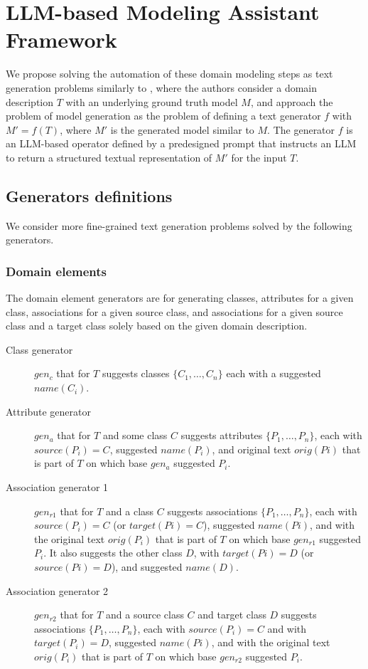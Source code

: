 \chapter{LLM-based Modeling Assistant Framework}

We propose solving the automation of these domain modeling steps as text generation problems similarly to \citet{Chen2023}, where the authors consider a domain description $T$ with an underlying ground truth model $M$, and approach the problem of model generation as the problem of defining a text generator $f$ with $M' = f(T)$, where $M'$ is the generated model similar to $M$. The generator $f$ is an LLM-based operator defined by a predesigned prompt that instructs an LLM to return a structured textual representation of $M'$ for the input $T$.


\section{Generators definitions}

We consider more fine-grained text generation problems solved by the following generators.


\subsection{Domain elements}

The domain element generators are for generating classes, attributes for a given class, associations for a given source class, and associations for a given source class and a target class solely based on the given domain description.

\begin{description}
\item [Class generator] $gen_c$ that for $T$ suggests classes $\{C_1, \ldots, C_n\}$ each with a suggested $name(C_i)$.

\item [Attribute generator] $gen_a$ that for $T$ and some class $C$ suggests attributes $\{P_1, \ldots, P_n\}$, each with $source(P_i) = C$, suggested $name(P_i)$, and original text $orig(Pi)$ that is part of $T$ on which base $gen_a$ suggested $P_i$.

\item [Association generator 1] $gen_{r1}$ that for $T$ and a class $C$ suggests associations $\{P_1, \ldots, P_n\}$, each with $source(P_i) = C$ (or $target(Pi) = C$), suggested $name(Pi)$, and with the original text $orig(P_i)$ that is part of $T$ on which base $gen_{r1}$ suggested $P_i$. It also suggests the other class $D$, with $target(Pi)= D$ (or $source(Pi) = D$), and suggested $name(D)$.

\item [Association generator 2] $gen_{r2}$ that for $T$ and a source class $C$ and target class $D$ suggests associations $\{P_1, \ldots, P_n\}$, each with $source(P_i) = C$ and with $target(P_i) = D$, suggested $name(Pi)$, and with the original text $orig(P_i)$ that is part of $T$ on which base $gen_{r2}$ suggested $P_i$.
\end{description}



